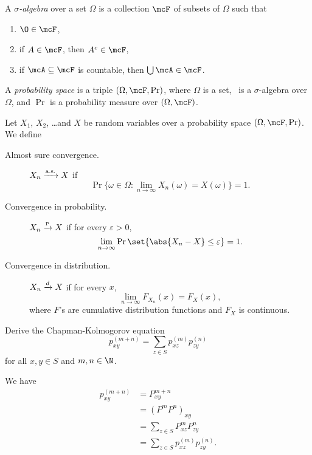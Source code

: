 \begin{definition} \label{def:sigma_algebra}
    A \emph{$\sigma$-algebra} over a set $\Omega$ is a collection $\mcF$ of
    subsets of $\Omega$ such that
    \begin{enumerate}
        \item $\O \in \mcF$,
        \item if $A \in \mcF$, then $A^c \in \mcF$,
        \item if $\mcA \subseteq \mcF$ is countable, then
            $\bigcup \mcA \in \mcF$.
    \end{enumerate}
\end{definition}
\begin{definition} \label{def:probability_space}
    A \emph{probability space} is a triple $(\Omega, \mcF, \Pr)$, where
    $\Omega$ is a set, \mcF\ is a $\sigma$-algebra over $\Omega$, and
    $\Pr$ is a probability measure over $(\Omega, \mcF)$.
\end{definition}

\begin{definition}
    Let $X_1$, $X_2$, \ldots and $X$ be random variables over a probability
    space $(\Omega, \mcF, \Pr)$.
    We define
    \begin{description}
        \item[Almost sure convergence.] $X_n \xrightarrow{\text{a.s.}} X$ if \[
            \Pr\{\omega \in \Omega : \lim_{n \to \infty} X_n(\omega)
                = X(\omega)\} = 1.
        \]
        \item[Convergence in probability.] $X_n \xrightarrow{\text{\tiny P}} X$ if for every
        $\varepsilon > 0$, \[
            \lim_{n \to \infty} \Pr \set{\abs{X_n - X} \le \varepsilon} = 1.
        \]
        \item[Convergence in distribution.] $X_n \xrightarrow{d} X$ if for every $x$,
        \[
            \lim_{n \to \infty} F_{X_n}(x) = F_X(x),
        \] where $F$'s are cumulative distribution functions and $F_X$ is
        continuous.
    \end{description}
\end{definition}

\begin{exercise}
    Derive the Chapman-Kolmogorov equation \[
        p_{xy}^{(m+n)} = \sum_{z \in S} p_{xz}^{(m)} p_{zy}^{(n)}
    \] for all $x, y \in S$ and $m, n \in \N$.
\end{exercise}
\begin{solution}
    We have \begin{align*}
        p_{xy}^{(m+n)} &= P^{m+n}_{xy} \\
            &= (P^m P^n)_{xy} \\
            &= \sum_{z \in S} P^m_{xz} P^n_{zy} \\
            &= \sum_{z \in S} p_{xz}^{(m)} p_{zy}^{(n)}.
    \end{align*}
\end{solution}

